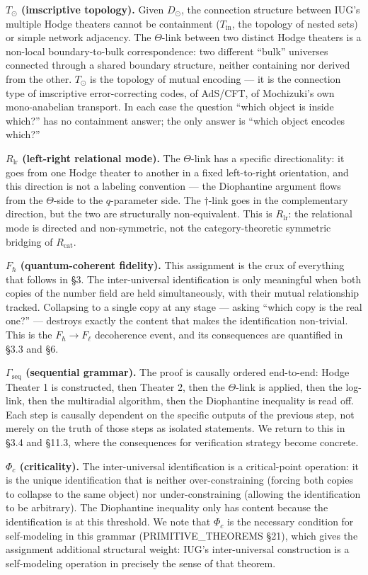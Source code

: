 \documentclass[10pt,a4paper]{article}
\newcommand{\pilcrow}{\S}
\begin{document}
\textbf{$T_\odot$ (imscriptive topology).}
Given $D_\odot$, the connection structure between IUG's multiple Hodge theaters cannot be
containment ($T_\text{in}$, the topology of nested sets) or simple network adjacency.
The $\Theta$-link between two distinct Hodge theaters is a non-local boundary-to-bulk
correspondence: two different ``bulk'' universes connected through a shared boundary structure,
neither containing nor derived from the other.
$T_\odot$ is the topology of mutual encoding --- it is the connection type of imscriptive
error-correcting codes, of AdS/CFT, of Mochizuki's own mono-anabelian transport.
In each case the question ``which object is inside which?'' has no containment answer;
the only answer is ``which object encodes which?''

\textbf{$R_\text{lr}$ (left-right relational mode).}
The $\Theta$-link has a specific directionality: it goes from one Hodge theater to another
in a fixed left-to-right orientation, and this direction is not a labeling convention ---
the Diophantine argument flows from the $\Theta$-side to the $q$-parameter side.
The $\dagger$-link goes in the complementary direction, but the two are structurally
non-equivalent.
This is $R_\text{lr}$: the relational mode is directed and non-symmetric,
not the category-theoretic symmetric bridging of $R_\text{cat}$.

\textbf{$F_{\hbar}$ (quantum-coherent fidelity).}
This assignment is the crux of everything that follows in \S3.
The inter-universal identification is only meaningful when both copies of the number field
are held simultaneously, with their mutual relationship tracked.
Collapsing to a single copy at any stage --- asking ``which copy is the real one?'' ---
destroys exactly the content that makes the identification non-trivial.
This is the $F_{\hbar} \to F_{\ell}$ decoherence event, and its consequences are quantified
in \S3.3 and \S6.

\textbf{$\Gamma_\text{seq}$ (sequential grammar).}
The proof is causally ordered end-to-end: Hodge Theater 1 is constructed, then Theater 2,
then the $\Theta$-link is applied, then the log-link, then the multiradial algorithm,
then the Diophantine inequality is read off.
Each step is causally dependent on the specific outputs of the previous step,
not merely on the truth of those steps as isolated statements.
We return to this in \S3.4 and \S11.3, where the consequences for verification strategy
become concrete.

\textbf{$\Phi_c$ (criticality).}
The inter-universal identification is a critical-point operation:
it is the unique identification that is neither over-constraining
(forcing both copies to collapse to the same object) nor under-constraining
(allowing the identification to be arbitrary).
The Diophantine inequality only has content because the identification is at this threshold.
We note that $\Phi_c$ is the necessary condition for self-modeling in this grammar
(PRIMITIVE\_THEOREMS \pilcrow{}21), which gives the assignment additional structural weight:
IUG's inter-universal construction is a self-modeling operation in precisely the
sense of that theorem.
\end{document}
